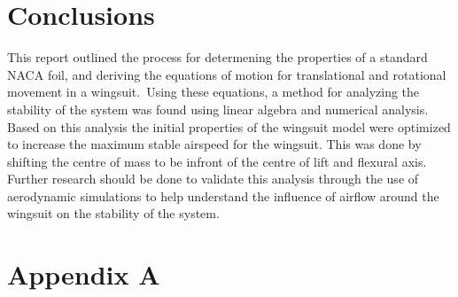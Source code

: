 \documentclass[11pt]{article}
\begin{document}
\section*{Conclusions}\label{sec:conclusion}
This report outlined the process for determening the properties of a standard NACA foil, and deriving the equations of motion for translational and rotational movement in a wingsuit.\
Using these equations, a method for analyzing the stability of the system was found using linear algebra and numerical analysis.
Based on this analysis the initial properties of the wingsuit model were optimized to increase the maximum stable airspeed for the wingsuit. This was done by shifting the centre of mass to be infront of the centre of lift and flexural axis.
Further research should be done to validate this analysis through the use of aerodynamic simulations to help understand the influence of airflow around the wingsuit on the stability of the system.

{}


\pagebreak
\section*{Appendix A}\label{sec:code}

\pagebreak
\thispagestyle{empty}
\end{document}
